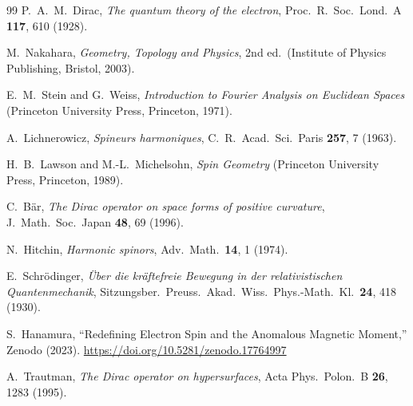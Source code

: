 \documentclass[%
 reprint, amsmath,amssymb, aps, prb, ]{revtex4-2}
\numberwithin{equation}{section}
\begin{document}
\begin{thebibliography}{99}
P.~A.~M.~Dirac,
\textit{The quantum theory of the electron},
Proc.\ R.\ Soc.\ Lond.\ A \textbf{117}, 610 (1928).

M.~Nakahara,
\textit{Geometry, Topology and Physics}, 2nd ed.\ (Institute of Physics Publishing, Bristol, 2003).

E.~M.~Stein and G.~Weiss,
\textit{Introduction to Fourier Analysis on Euclidean Spaces} (Princeton University Press, Princeton, 1971).

A.~Lichnerowicz,
\textit{Spineurs harmoniques},
C.~R.\ Acad.\ Sci.\ Paris \textbf{257}, 7 (1963).

H.~B.~Lawson and M.-L.~Michelsohn,
\textit{Spin Geometry} (Princeton University Press, Princeton, 1989).

C.~B\"ar,
\textit{The Dirac operator on space forms of positive curvature},
J.\ Math.\ Soc.\ Japan \textbf{48}, 69 (1996).

N.~Hitchin,
\textit{Harmonic spinors},
Adv.\ Math.\ \textbf{14}, 1 (1974).

E.~Schr\"odinger,
\textit{\"Uber die kr\"aftefreie Bewegung in der relativistischen Quantenmechanik},
Sitzungsber.\ Preuss.\ Akad.\ Wiss.\ Phys.-Math.\ Kl.\ \textbf{24}, 418 (1930).

S.~Hanamura,
``Redefining Electron Spin and the Anomalous Magnetic Moment,''
Zenodo (2023).
\href{https://doi.org/10.5281/zenodo.17764997}{https://doi.org/10.5281/zenodo.17764997}

A.~Trautman,
\textit{The Dirac operator on hypersurfaces},
Acta Phys.\ Polon.\ B \textbf{26}, 1283 (1995).

\end{thebibliography}
\end{document}
